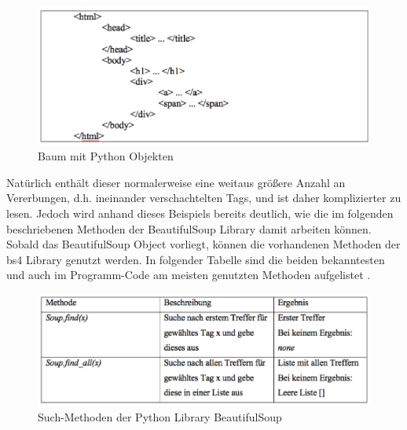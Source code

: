 \documentclass[a4paper,oneside,12pt]{report}
\begin{document}
			
			\begin{figure}[H]
				\centering
				\begin{minipage}[b]{0.9\textwidth}
					\includegraphics[width=\textwidth]{Bilder/HTMLcode.png}
				\end{minipage}
				\centering
				\caption[HTML Code bs4]{Baum mit Python Objekten \cite{bib-webpython}}
				\label{pic-HTMLcode}
			\end{figure}
			
			Natürlich enthält dieser normalerweise eine weitaus größere Anzahl an Vererbungen, d.h. ineinander verschachtelten Tags, und ist daher komplizierter zu lesen. Jedoch wird anhand dieses Beispiels bereits deutlich, wie die im folgenden beschriebenen Methoden der BeautifulSoup Library damit arbeiten können.
			\\
			\newline
			Sobald das BeautifulSoup Object vorliegt, können die vorhandenen Methoden der bs4 Library genutzt werden. In folgender Tabelle sind die beiden bekanntesten und auch im Programm-Code am meisten genutzten Methoden aufgelistet \cite{bib-bs4}.
		
			\begin{figure}[H]
				\centering
				\begin{minipage}[b]{0.9\textwidth}
					\includegraphics[width=\textwidth]{Bilder/SoupMethoden.png}
				\end{minipage}
				\centering
				\caption[Methoden bs4]{Such-Methoden der Python Library BeautifulSoup \cite{bib-bs4}}
				\label{pic-SoupMethoden}
			\end{figure}
			
\end{document}
